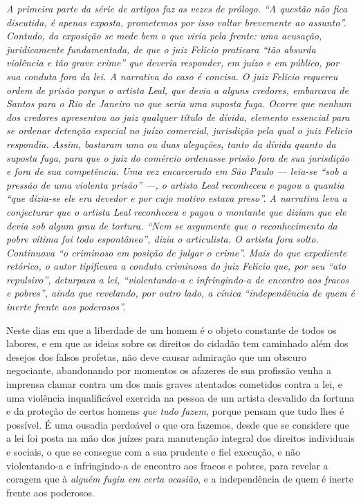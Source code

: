 \begin{didascalia}
\emph{A primeira parte da série de artigos faz as vezes de prólogo. ``A
questão não fica discutida, é apenas exposta, prometemos por isso voltar
brevemente ao assunto''. Contudo, da exposição se mede bem o que viria
pela frente: uma acusação, juridicamente fundamentada, de que o juiz
Felicio praticara ``tão absurda violência e tão grave crime'' que deveria
responder, em juízo e em público, por sua conduta fora da lei. A
narrativa do caso é concisa. O juiz Felicio requereu ordem de prisão
porque o artista Leal, que devia a alguns credores, embarcava de Santos
para o Rio de Janeiro no que seria uma suposta fuga. Ocorre que nenhum
dos credores apresentou ao juiz qualquer título de dívida, elemento
essencial para se ordenar detenção especial no juízo comercial,
jurisdição pela qual o juiz Felicio respondia. Assim, bastaram uma ou
duas alegações, tanto da dívida quanto da suposta fuga, para que o juiz
do comércio ordenasse prisão fora de sua jurisdição e fora de sua
competência. Uma vez encarcerado em São Paulo --- leia-se ``sob a pressão
de uma violenta prisão'' ---, o artista Leal reconheceu e pagou a quantia
``que dizia-se ele era devedor e por cujo motivo estava preso''. A
narrativa leva a conjecturar que o artista Leal reconheceu e pagou o
montante que diziam que ele devia sob algum grau de tortura. ``Nem se
argumente que o reconhecimento da pobre vítima foi todo espontâneo'',
dizia o articulista. O artista fora solto. Continuava ``o criminoso em
posição de julgar o crime''. Mais do que expediente retórico, o autor
tipificava a conduta criminosa do juiz Felicio que, por seu ``ato
repulsivo'', deturpava a lei, ``violentando-a e infringindo-a de encontro
aos fracos e pobres'', ainda que revelando, por outro lado, a cínica
``independência de quem é inerte frente aos poderosos''.}
\end{didascalia}


Neste dias em que a liberdade de um homem é o objeto constante de todos
os labores, e em que as ideias sobre os direitos do cidadão tem
caminhado além dos desejos dos falsos profetas, não deve causar
admiração que um obscuro negociante, abandonando por momentos os
afazeres de sua profissão venha a imprensa clamar contra um dos mais
graves atentados cometidos contra a lei, e uma violência inqualificável
exercida na pessoa de um artista desvalido da fortuna e da proteção de
certos homens \emph{que tudo fazem}, porque pensam que tudo lhes é
possível. É uma ousadia perdoável o que ora fazemos, desde que se
considere que a lei foi posta na mão dos juízes para manutenção integral
dos direitos individuais e sociais, o que se consegue com a sua prudente
e fiel execução, e não violentando-a e infringindo-a de encontro aos
fracos e pobres, para revelar a coragem que à \emph{alguém fugiu em
certa ocasião}, e a independência de quem é inerte frente aos poderosos.


